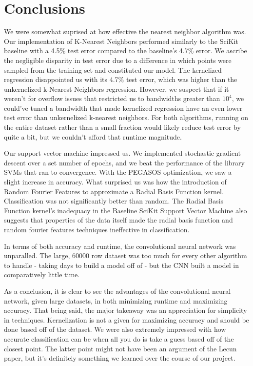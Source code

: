 \documentclass{article} %
\begin{document}
\section{Conclusions}
We were somewhat suprised at how effective the nearest neighbor algorithm was.
Our implementation of K-Nearest Neighbors performed similarly to the SciKit baseline
with a 4.5\% test error compared to the baseline's 4.7\% error. We ascribe the negligible
disparity in test error due to a difference in which points were sampled from the training set
and constituted our model. The kernelized regression disappointed us with its 4.7\% test error,
which was higher than the unkernelized k-Nearest Neighbors regression. However, we suspect
that if it weren't for overflow issues that restricted us to bandwidths greater than $10^4$, 
we could've tuned a bandwidth that made kernelized regression have an even lower test error than
unkernelized k-nearest neighbors. For both algorithms, running on the entire dataset rather than a
small fraction would likely reduce test error by quite a bit, but we couldn't afford that runtime
magnitude.

Our support vector machine impressed us. We implemented stochastic gradient descent over a set
number of epochs, and we beat the performance of the library SVMs that ran to convergence. With the
PEGASOS optimization, we saw a slight increase in accuracy. What surprised us was how the introduction
of Random Fourier Features to approximate a Radial Basis Function kernel. Classification was not 
significantly better than random. The Radial Basis Function kernel's inadequacy in the Baseline
SciKit Support Vector Machine also suggests that properties of the data itself made the radial
basis function and random fourier features techniques ineffective in classification.

In terms of both accuracy and runtime, the convolutional neural network was unparalled. The large,
60000 row dataset was too much for every other algorithm to handle - taking days to build a model 
off of - but the CNN built a model in comparatively little time. 

As a conclusion, it is clear to see the advantages of the convolutional neural network, given large
datasets, in both minimizing runtime and maximizing accuracy. That being said, the major takeaway
was an appreciation for simplicity in techniques. Kernelization is not a given for maximizing accuracy and should be done based off of the dataset. We were also extremely impressed with how accurate
classification can be when all you do is take a guess based off of the closest point. The latter
point might not have been an argument of the Lecun paper, but it's definitely something we learned
over the course of our project.
\end{document}
